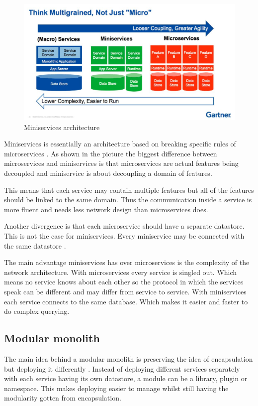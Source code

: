 \begin{figure}[H]
	\includegraphics[width=\linewidth]{miniservices.png}
	\caption{Miniservices architecture \cite{miniservicesDefinition}}
\end{figure}

Miniservices is essentially an architecture based on breaking specific rules of microservices \cite{miniservicesOrigin}. As shown in the picture the biggest difference between microservices and miniservices is that microservices are actual features being decoupled and miniservice is about decoupling a domain of features.

This means that each service may contain multiple features but all of the features should be linked to the same domain. Thus the communication inside a service is more fluent and needs less network design than microservices does.

Another divergence is that each microservice should have a separate datastore. This is not the case for miniservices. Every miniservice may be connected with the same datastore \cite{miniservicesDefinition}.

The main advantage miniservices has over microservices is the complexity of the network architecture. With microservices every service is singled out. Which means no service knows about each other so the protocol in which the services speak can be different and may differ from service to service. With miniservices each service connects to the same database. Which makes it easier and faster to do complex querying.

\subsection{Modular monolith}
\label{sec:ModularMonolith}

The main idea behind a modular monolith is preserving the idea of encapsulation but deploying it differently \cite{modularMonolithIdea}. Instead of deploying different services separately with each service having its own datastore, a module can be a library, plugin or namespace. This makes deploying easier to manage whilst still having the modularity gotten from encapsulation.

